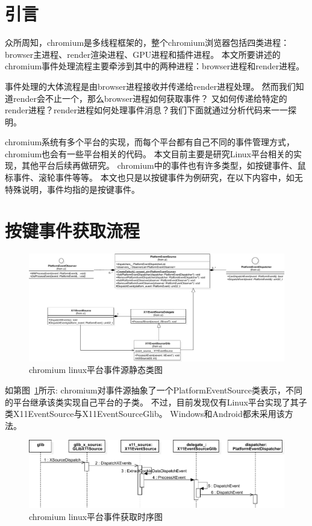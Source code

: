 \section{引言}
众所周知，chromium是多线程框架的，整个chromium浏览器包括四类进程：browser主进程、render渲染进程、GPU进程和插件进程。
本文所要讲述的chromium事件处理流程主要牵涉到其中的两种进程：browser进程和render进程。

事件处理的大体流程是由browser进程接收并传递给render进程处理。
然而我们知道render会不止一个，那么browser进程如何获取事件？
又如何传递给特定的render进程？render进程如何处理事件消息？我们下面就通过分析代码来一一探明。

chromium系统有多个平台的实现，而每个平台都有自己不同的事件管理方式，chromium也会有一些平台相关的代码。
本文目前主要是研究Linux平台相关的实现，其他平台后续再做研究。
chromium中的事件也有许多类型，如按键事件、鼠标事件、滚轮事件等等。
本文也只是以按键事件为例研究，在以下内容中，如无特殊说明，事件均指的是按键事件。

\section{按键事件获取流程}
\begin{figure}[H] 
  \centering 
  \includegraphics[width=\textwidth]{image/event_study/linux_event_source_class.pdf} 
  \caption{chromium linux平台事件源静态类图} \label{fig:linux_event_source_class} 
\end{figure}

如第图~\ref{fig:linux_event_source_class}所示:
chromium对事件源抽象了一个PlatformEventSource类表示，不同的平台继承该类实现自己平台的子类。
不过，目前发现仅有Linux平台实现了其子类X11EventSource与X11EventSourceGlib。
Windows和Android都未采用该方法。

\begin{figure}[H] 
  \centering 
  \includegraphics[width=\textwidth]{image/event_study/linux_get_event_from_source.pdf} 
  \caption{chromium linux平台事件获取时序图} \label{fig:linux_get_event_from_source} 
\end{figure}

